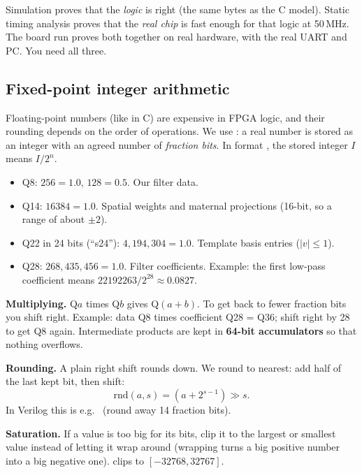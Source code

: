 \documentclass[11pt]{article}
\newcommand{\mods}[1]{\texttt{\detokenize{#1}}}   %
\begin{document}
\begin{lesson}
Simulation proves that the \emph{logic} is right (the same bytes as the C model). Static timing analysis proves that the \emph{real chip} is fast enough for that logic at 50\,MHz. The board run proves both together on real hardware, with the real UART and PC. You need all three.
\end{lesson}

\subsection{Fixed-point integer arithmetic}\label{sec:fixed}
Floating-point numbers (like \mods{float} in C) are expensive in FPGA logic, and their rounding depends on the order of operations. We use : a real number is stored as an integer with an agreed number of \emph{fraction bits}. In format , the stored integer $I$ means $I / 2^n$.
\begin{itemize}
  \item Q8: $256 = 1.0$, $128 = 0.5$. Our filter data.
  \item Q14: $16384 = 1.0$. Spatial weights and maternal projections (16-bit, so a range of about $\pm 2$).
  \item Q22 in 24 bits (``s24''): $4{,}194{,}304 = 1.0$. Template basis entries ($|v| \le 1$).
  \item Q28: $268{,}435{,}456 = 1.0$. Filter coefficients. Example: the first low-pass coefficient \mods{22192263} means $22192263/2^{28} \approx 0.0827$.
\end{itemize}

\textbf{Multiplying.} Q$a$ times Q$b$ gives Q$(a+b)$. To get back to fewer fraction bits you shift right. Example: data Q8 times coefficient Q28 = Q36; shift right by 28 to get Q8 again. Intermediate products are kept in \textbf{64-bit accumulators} so that nothing overflows.

\textbf{Rounding.} A plain right shift rounds down. We round to nearest: add half of the last kept bit, then shift:
\[
\text{rnd}(a, s) = (a + 2^{s-1}) \gg s .
\]
In Verilog this is e.g.\ \mods{(acc + 64'sd8192) >>> 14} (round away 14 fraction bits).

\textbf{Saturation.} If a value is too big for its bits, clip it to the largest or smallest value instead of letting it wrap around (wrapping turns a big positive number into a big negative one). \mods{sat16} clips to $[-32768, 32767]$.
\end{document}
